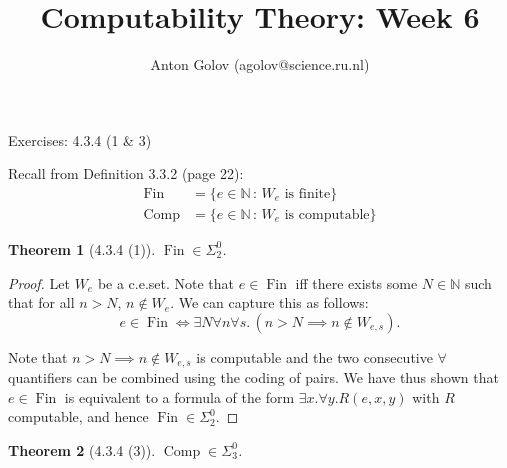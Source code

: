 \documentclass{article}
\title{Computability Theory: Week 6}
\author{Anton Golov (agolov@science.ru.nl)}
\newtheorem{theorem}{Theorem}
\newcommand{\compr}[2]{\{ #1 \,:\, #2 \}}
\DeclareMathOperator{\Fin}{Fin}
\DeclareMathOperator{\Comp}{Comp}
\begin{document}
  \maketitle

  Exercises: 4.3.4 (1 \& 3)

  Recall from Definition 3.3.2 (page 22):
  \begin{align*}
    \Fin &= \compr{e \in \mathbb{N}}{\text{$W_e$ is finite}}\\
    \Comp &= \compr{e \in \mathbb{N}}{\text{$W_e$ is computable}}
  \end{align*}

  \begin{theorem}[4.3.4 (1)]
    $\Fin \in \Sigma^0_2$.
  \end{theorem}

  \begin{proof}
    Let $W_e$ be a c.e.\@ set.  Note that $e \in \Fin$ iff there exists some
    $N \in \mathbb{N}$ such that for all $n > N$, $n \not \in W_e$.  We can capture this as
    follows:
    \[
      e \in \Fin \iff \exists N\forall n\forall s.\, (n > N \implies n \not \in W_{e, s}).
    \]

    Note that $n > N \implies n \not \in W_{e, s}$ is computable and the two consecutive $\forall$
    quantifiers can be combined using the coding of pairs.  We have thus shown that $e \in \Fin$ is equivalent
    to a formula of the form $\exists x. \forall y. R(e, x, y)$ with $R$ computable, and hence $\Fin \in \Sigma^0_2$.
  \end{proof}

  \begin{theorem}[4.3.4 (3)]
    $\Comp \in \Sigma^0_3$.
  \end{theorem}
\end{document}
